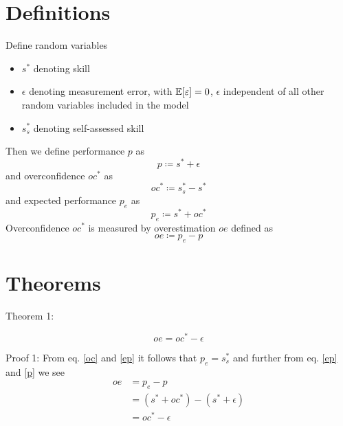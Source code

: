 \section{Definitions}
Define random variables
\begin{itemize}
 \item $s^*$ denoting skill
 \item $\epsilon$ denoting measurement error, with $\mathbb{E}[\varepsilon] = 0$, $\epsilon$ independent of all other random variables included in the model
 \item $s^*_s$ denoting self-assessed skill
\end{itemize}

\noindent Then we define performance $p$ as
\begin{equation} \label{p}
  p \coloneq s^* + \epsilon
\end{equation}
and overconfidence $oc^*$ as
\begin{equation} \label{oc}
  oc^* \coloneq s^*_s-s^*
\end{equation}
and expected performance $p_e$ as
\begin{equation} \label{ep}
  p_e \coloneq s^* + oc^*
\end{equation}
Overconfidence $oc^*$ is measured by overestimation $oe$ defined as
\begin{equation}
  oe \coloneq p_e - p
\end{equation}

\section{Theorems}

Theorem 1:

\begin{equation}
  oe = oc^* - \epsilon
\end{equation}

Proof 1:
\noindent From eq. \ref{oc} and \ref{ep} it follows that $p_e = s^*_s$ and further from eq. \ref{ep} and \ref{p} we see
\begin{align} \label{dd}
  oe &= p_e - p \\
  &= (s^* + oc^*) - (s^* + \epsilon) \\
  &= oc^* - \epsilon
\end{align}
